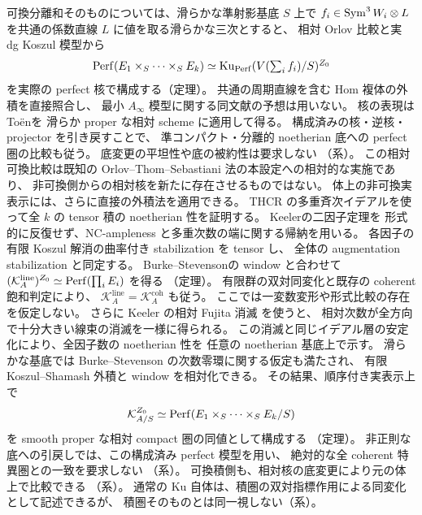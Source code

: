 可換分離和そのものについては、滑らかな準射影基底 $S$ 上で
$f_i\in\operatorname{Sym}^3W_i\otimes L$ を共通の係数直線 $L$ に値を取る滑らかな三次とすると、
相対 Orlov 比較\cite[Corollary~3.4]{MBRPBDFIK}と実 dg Koszul 模型から
\[
 \operatorname{Perf}(E_1\times_S\cdots\times_SE_k)
 \simeq\operatorname{Ku}_{\operatorname{Perf}}(V(\textstyle\sum_i f_i)/S)^{Z_0}
\]
を実際の perfect 核で構成する（定理）。
共通の周期直線を含む Hom 複体の外積を直接照合し、
最小 $A_\infty$ 模型に関する同文献の予想は用いない。
核の表現は To\"en\cite[Theorem~8.15]{MBRPToenMorita}を
滑らか proper な相対 scheme に適用して得る。
構成済みの核・逆核・projector を引き戻すことで、
準コンパクト・分離的 noetherian 底への perfect 圏の比較も従う。
底変更の平坦性や底の被約性は要求しない
（系）。
この相対可換比較は既知の Orlov--Thom--Sebastiani 法の本設定への相対的な実施であり、
非可換側からの相対核を新たに存在させるものではない。
体上の非可換実表示には、さらに直接の外積法を適用できる。
THCR の多重斉次イデアルを使って全 $k$ の tensor 積の noetherian 性を証明する。
Keeler\cite[Theorem~2.7, Corollary~3.5]{MBNPKeelerMultiple}の二因子定理を
形式的に反復せず、NC-ampleness と多重次数の端に関する帰納を用いる。
各因子の有限 Koszul 解消の曲率付き stabilization を tensor し、
全体の augmentation stabilization と同定する。
Burke--Stevenson\cite[Theorem~6.4]{LP-BS}の window と合わせて
$(\mathcal K_A^{\mathrm{line}})^{Z_0}\simeq\operatorname{Perf}(\prod_iE_i)$ を得る
（定理）。
有限群の双対同変化と既存の coherent 飽和判定により、
$\mathcal K_A^{\mathrm{line}}=\mathcal K_A^{\mathrm{coh}}$ も従う。
ここでは一変数変形や形式比較の存在を仮定しない。
さらに Keeler の相対 Fujita 消滅
\cite[Theorem~1.5, Definition~2.9, erratum Theorem~E2.5]{NFMKeelerAmple}を使うと、
相対次数が全方向で十分大きい線束の消滅を一様に得られる。
この消滅と同じイデアル層の安定化により、全因子数の noetherian 性を
任意の noetherian 基底上で示す。
滑らかな基底では Burke--Stevenson の次数零環に関する仮定も満たされ、
有限 Koszul--Shamash 外積と window を相対化できる。
その結果、順序付き実表示上で
\[
 \mathcal K_{A/S}^{Z_0}\simeq\operatorname{Perf}(E_1\times_S\cdots\times_SE_k/S)
\]
を smooth proper な相対 compact 圏の同値として構成する
（定理）。
非正則な底への引戻しでは、この構成済み perfect 模型を用い、
絶対的な全 coherent 特異圏との一致を要求しない
（系）。
可換積側も、相対核の底変更により元の体上で比較できる
（系）。
通常の Ku 自体は、積圏の双対指標作用による同変化として記述できるが、
積圏そのものとは同一視しない（系）。
